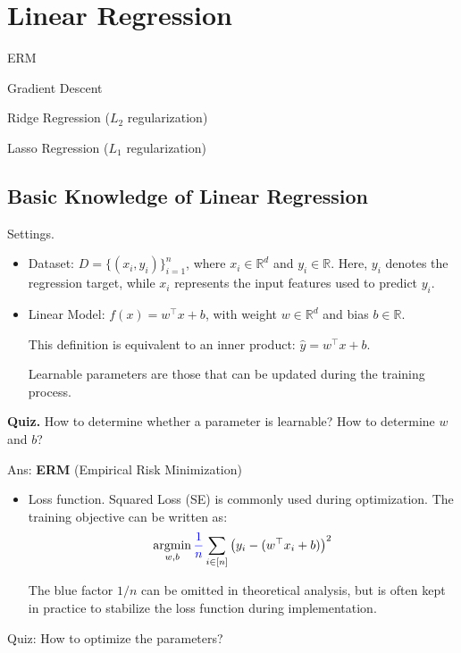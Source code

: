 \documentclass[../main]{subfiles}
\begin{document}
\chapter{Linear Regression}
\begin{introduction}
\item ERM
\item Gradient Descent
\item Ridge Regression ($L_2$ regularization)
\item Lasso Regression ($L_1$ regularization)
\end{introduction}
\section{Basic Knowledge of Linear Regression}

{Settings.}
\begin{itemize}
  \item Dataset: $D=\{(x_i,y_i)\}_{i=1}^n$, where $x_i\in\mathbb{R}^d$ and $y_i\in\mathbb{R}$.  
  Here, $y_i$ denotes the regression target, while $x_i$ represents the input features used to predict $y_i$.

  \item Linear Model: $f(x)=w^{\top}x+b$, with weight $w\in\mathbb{R}^d$ and bias $b\in\mathbb{R}$.  
  \begin{note}
    This definition is equivalent to an inner product:  
    $\hat y = w^{\top}x+b.$
  \end{note}

  \begin{definition}
    Learnable parameters are those that can be updated during the training process.
  \end{definition}
\end{itemize}

\noindent\textbf{Quiz.} How to determine whether a parameter is learnable? How to determine $w$ and $b$?


\noindent Ans: \textbf{ERM} (Empirical Risk Minimization)

\begin{itemize}
  \item Loss function. Squared Loss (SE) is commonly used during optimization. The training objective can be written as:
    \begin{equation}
        \mathop{\mathrm{argmin}}_{w,b}{\color{blue}{\frac{1}{n}}}\sum_{i\in[n]}\left(y_i-(w^\top x_i+b)\right)^2
      \end{equation}
  
  The blue factor $1/n$ can be omitted in theoretical analysis, but is often kept in practice to stabilize the loss function during implementation.
\end{itemize}
Quiz: How to optimize the parameters?
\end{document}
